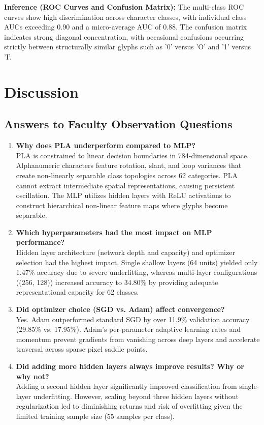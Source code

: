 \documentclass[12pt,a4paper]{article}
\begin{document}
\textbf{Inference (ROC Curves and Confusion Matrix):}
The multi-class ROC curves show high discrimination across character classes, with individual class AUCs exceeding 0.90 and a micro-average AUC of 0.88. The confusion matrix indicates strong diagonal concentration, with occasional confusions occurring strictly between structurally similar glyphs such as '0' versus 'O' and '1' versus 'I'.

\section{Discussion}
\subsection{Answers to Faculty Observation Questions}
\begin{enumerate}
    \item \textbf{Why does PLA underperform compared to MLP?} \\
    PLA is constrained to linear decision boundaries in 784-dimensional space. Alphanumeric characters feature rotation, slant, and loop variances that create non-linearly separable class topologies across 62 categories. PLA cannot extract intermediate spatial representations, causing persistent oscillation. The MLP utilizes hidden layers with ReLU activations to construct hierarchical non-linear feature maps where glyphs become separable.
    
    \item \textbf{Which hyperparameters had the most impact on MLP performance?} \\
    Hidden layer architecture (network depth and capacity) and optimizer selection had the highest impact. Single shallow layers (64 units) yielded only 1.47\% accuracy due to severe underfitting, whereas multi-layer configurations ((256, 128)) increased accuracy to 34.80\% by providing adequate representational capacity for 62 classes.
    
    \item \textbf{Did optimizer choice (SGD vs. Adam) affect convergence?} \\
    Yes. Adam outperformed standard SGD by over 11.9\% validation accuracy (29.85\% vs. 17.95\%). Adam's per-parameter adaptive learning rates and momentum prevent gradients from vanishing across deep layers and accelerate traversal across sparse pixel saddle points.
    
    \item \textbf{Did adding more hidden layers always improve results? Why or why not?} \\
    Adding a second hidden layer significantly improved classification from single-layer underfitting. However, scaling beyond three hidden layers without regularization led to diminishing returns and risk of overfitting given the limited training sample size (55 samples per class).
    

\end{enumerate}
\end{document}
